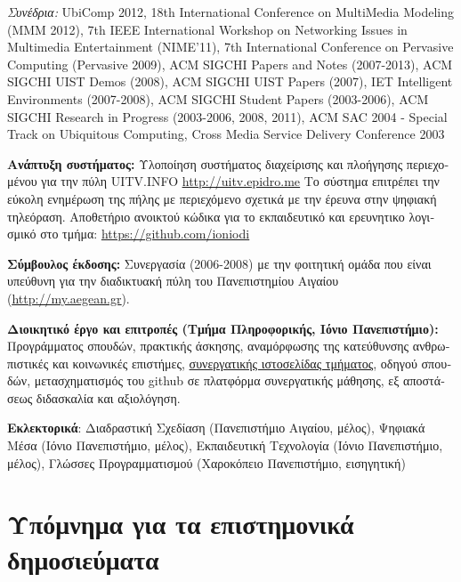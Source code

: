 \documentclass[11pt, a4paper]{article}
\begin{document}
\begin{greek}
\emph{Συνέδρια:} UbiComp 2012, 18th International Conference on
MultiMedia Modeling (MMM 2012), 7th IEEE International Workshop on
Networking Issues in Multimedia Entertainment (NIME'11), 7th
International Conference on Pervasive Computing (Pervasive 2009), ACM
SIGCHI Papers and Notes (2007-2013), ACM SIGCHI UIST Demos (2008), ACM
SIGCHI UIST Papers (2007), IEΤ Intelligent Environments (2007-2008), ACM
SIGCHI Student Papers (2003-2006), ACM SIGCHI Research in Progress
(2003-2006, 2008, 2011), ACM SAC 2004 - Special Track on Ubiquitous
Computing, Cross Media Service Delivery Conference 2003

\textbf{Ανάπτυξη συστήματος:} Υλοποίηση συστήματος διαχείρισης και
πλοήγησης περιεχομένου για την πύλη UITV.INFO
\href{http://uitv.epidro.me}{\uline{http://uitv.epidro.me}} Το σύστημα
επιτρέπει την εύκολη ενημέρωση της πήλης με περιεχόμενο σχετικά με την
έρευνα στην ψηφιακή τηλεόραση. Αποθετήριο ανοικτού κώδικα για το
εκπαιδευτικό και ερευνητικο λογισμικό στο τμήμα:
\href{https://github.com/ioniodi}{\uline{https://github.com/ioniodi}}

\textbf{Σύμβουλος έκδοσης:} Συνεργασία (2006-2008) με την φοιτητική
ομάδα που είναι υπεύθυνη για την διαδικτυακή πύλη του Πανεπιστημίου
Αιγαίου (\href{http://my.aegean.gr/}{\uline{http://my.aegean.gr}}).

\textbf{Διοικητικό έργο και επιτροπές (Τμήμα Πληροφορικής, Ιόνιο
Πανεπιστήμιο):} Προγράμματος σπουδών, πρακτικής άσκησης, αναμόρφωσης της
κατεύθυνσης ανθρωπιστικές και κοινωνικές επιστήμες,
\href{https://github.com/ioniodi/sitegr}{συνεργατικής ιστοσελίδας
τμήματος}, οδηγού σπουδών, μετασχηματισμός του github σε πλατφόρμα
συνεργατικής μάθησης, εξ αποστάσεως διδασκαλία και αξιολόγηση.

\textbf{Εκλεκτορικά}: Διαδραστική Σχεδίαση (Πανεπιστήμιο Αιγαίου,
μέλος), Ψηφιακά Μέσα (Ιόνιο Πανεπιστήμιο, μέλος), Εκπαιδευτική
Τεχνολογία (Ιόνιο Πανεπιστήμιο, μέλος), Γλώσσες Προγραμματισμού
(Χαροκόπειο Πανεπιστήμιο, εισηγητική)

\hypertarget{ux3c5ux3c0ux3ccux3bcux3bdux3b7ux3bcux3b1-ux3b3ux3b9ux3b1-ux3c4ux3b1-ux3b5ux3c0ux3b9ux3c3ux3c4ux3b7ux3bcux3bfux3bdux3b9ux3baux3ac-ux3b4ux3b7ux3bcux3bfux3c3ux3b9ux3b5ux3cdux3bcux3b1ux3c4ux3b1}{%
\section{Υπόμνημα για τα επιστημονικά
δημοσιεύματα}\label{ux3c5ux3c0ux3ccux3bcux3bdux3b7ux3bcux3b1-ux3b3ux3b9ux3b1-ux3c4ux3b1-ux3b5ux3c0ux3b9ux3c3ux3c4ux3b7ux3bcux3bfux3bdux3b9ux3baux3ac-ux3b4ux3b7ux3bcux3bfux3c3ux3b9ux3b5ux3cdux3bcux3b1ux3c4ux3b1}}


\end{greek}
\end{document}
